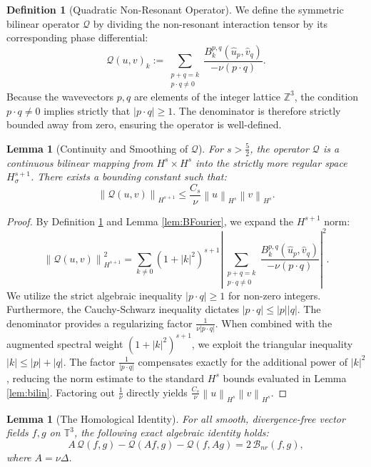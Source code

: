 \documentclass[12pt,a4paper]{article}
\theoremstyle{plain}
\newtheorem{lemma}[theorem]{Lemma}
\theoremstyle{definition}
\newtheorem{definition}[theorem]{Definition}
\theoremstyle{remark}
\newcommand{\Hs}{H^s}
\newcommand{\T}{\mathbb{T}}
\newcommand{\Z}{\mathbb{Z}}
\newcommand{\norm}[1]{\left\|#1\right\|}
\newcommand{\abs}[1]{\left|#1\right|}
\newcommand{\Bnr}{\mathcal{B}_{nr}}
\newcommand{\QQ}{\mathcal{Q}}
\begin{document}
\begin{definition}[Quadratic Non-Resonant Operator]
\label{def:Q}
We define the symmetric bilinear operator $\QQ$ by dividing the non-resonant interaction tensor by its corresponding phase differential:
\[
  \widehat{\QQ(u,v)}_k := \sum_{\substack{p+q=k\\p\cdot q\neq 0}} \frac{B_k^{p,q}(\hat{u}_p,\hat{v}_q)}{-\nu(p\cdot q)}.
\]
Because the wavevectors $p, q$ are elements of the integer lattice $\Z^3$, the condition $p \cdot q \neq 0$ implies strictly that $|p \cdot q| \ge 1$. The denominator is therefore strictly bounded away from zero, ensuring the operator is well-defined.
\end{definition}

\begin{lemma}[Continuity and Smoothing of $\QQ$]
\label{lem:Qcont}
For $s > \frac{5}{2}$, the operator $\QQ$ is a continuous bilinear mapping from $\Hs \times \Hs$ into the strictly more regular space $H^{s+1}_\sigma$. There exists a bounding constant such that:
\[
  \norm{\QQ(u,v)}_{H^{s+1}} \le \frac{C_s}{\nu} \norm{u}_{H^s} \norm{v}_{H^s}.
\]
\end{lemma}

\begin{proof}
By Definition \ref{def:Q} and Lemma \ref{lem:BFourier}, we expand the $H^{s+1}$ norm:
\[
  \norm{\QQ(u,v)}_{H^{s+1}}^2 = \sum_{k\neq 0} (1+|k|^2)^{s+1} \abs{ \sum_{\substack{p+q=k\\p\cdot q\neq 0}} \frac{B_k^{p,q}(\hat{u}_p,\hat{v}_q)}{-\nu(p\cdot q)} }^2.
\]
We utilize the strict algebraic inequality $|p \cdot q| \ge 1$ for non-zero integers. Furthermore, the Cauchy-Schwarz inequality dictates $|p \cdot q| \le |p||q|$. The denominator provides a regularizing factor $\frac{1}{\nu|p \cdot q|}$. When combined with the augmented spectral weight $(1+|k|^2)^{s+1}$, we exploit the triangular inequality $|k| \le |p| + |q|$. The factor $\frac{1}{|p \cdot q|}$ compensates exactly for the additional power of $|k|^2$, reducing the norm estimate to the standard $H^s$ bounds evaluated in Lemma \ref{lem:bilin}. Factoring out $\frac{1}{\nu}$ directly yields $\frac{C_s}{\nu} \norm{u}_{H^s} \norm{v}_{H^s}$.
\end{proof}

\begin{lemma}[The Homological Identity]
\label{lem:homo}
For all smooth, divergence-free vector fields $f, g$ on $\T^3$, the following exact algebraic identity holds:
\[
  A\,\QQ(f,g) - \QQ(Af,g) - \QQ(f,Ag) = 2\,\Bnr(f,g),
\]
where $A = \nu \Delta$.
\end{lemma}
\end{document}
